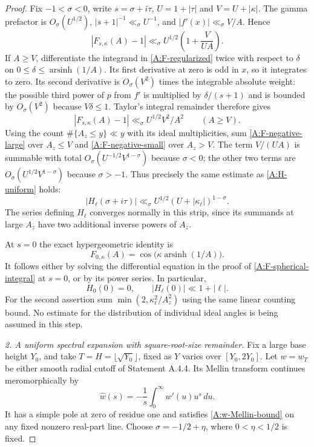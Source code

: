 \begin{proof}
Fix $-1<\sigma<0$, write $s=\sigma+i\tau$,
$U=1+|\tau|$ and $V=U+|\kappa|$. The gamma prefactor is
$O_\sigma(U^{1/2})$, $|s+1|^{-1}\ll_\sigma U^{-1}$,
and $|f'(x)|\ll_\sigma V/A$. Hence
\begin{equation}\label{A:F-negative-large}
 |F_{s,\kappa}(A)-1|
       \ll_\sigma U^{1/2}\left(1+\frac{V}{UA}\right).
\end{equation}
If $A\geq V$, differentiate the integrand in
\eqref{A:F-regularized} twice with respect to $\delta$ on
$0\leq\delta\leq\operatorname{arsinh}(1/A)$.
Its first derivative at zero is odd in $x$, so it integrates to
zero. Its second derivative is $O_\sigma(V^2)$ times the
integrable absolute weight: the possible third power of $p$
from $f'$ is multiplied by $\delta/(s+1)$ and is bounded by
$O_\sigma(V^2)$ because $V\delta\leq1$.
Taylor's integral remainder therefore gives
\begin{equation}\label{A:F-negative-small}
 |F_{s,\kappa}(A)-1|\ll_\sigma U^{1/2}V^2/A^2
 \qquad(A\geq V).
\end{equation}
Using the count $\#\{A_z\leq y\}\ll y$ with its ideal
multiplicities, sum \eqref{A:F-negative-large} over $A_z\leq V$
and \eqref{A:F-negative-small} over $A_z>V$.
The term $V/(UA)$ is summable with total
$O_\sigma(U^{-1/2}V^{1-\sigma})$ because $\sigma<0$;
the other two terms are
$O_\sigma(U^{1/2}V^{1-\sigma})$ because $\sigma>-1$.
Thus precisely the same estimate as \eqref{A:H-uniform} holds:
\begin{equation}\label{A:H-negative}
 |H_\ell(\sigma+i\tau)|
       \ll_\sigma U^{1/2}(U+|\kappa_\ell|)^{1-\sigma}.
\end{equation}
The series defining $H_\ell$ converges normally in this strip,
since its summands at large $A_z$ have two additional inverse
powers of $A_z$.

At $s=0$ the exact hypergeometric identity is
\[
 F_{0,\kappa}(A)=\cos\bigl(\kappa\operatorname{arsinh}(1/A)\bigr).
\]
It follows either by solving the differential equation in the proof
of \eqref{A:F-spherical-integral} at $s=0$, or by its power
series. In particular,
\begin{equation}\label{A:H-at-zero}
 H_0(0)=0,\qquad |H_\ell(0)|\ll1+|\ell|.
\end{equation}
For the second assertion sum
$\min(2,\kappa_\ell^2/A_z^2)$ using the same linear counting
bound. No estimate for the distribution of individual ideal angles
is being assumed in this step.

\emph{2. A uniform spectral expansion with square-root-size remainder.}
Fix a large base height $Y_0$, and take
$T=H=\lfloor\sqrt{Y_0}\rfloor$, fixed as $Y$ varies over
$[Y_0,2Y_0]$. Let $w=w_T$ be either smooth radial cutoff of
Statement A.4.4. Its Mellin transform continues meromorphically by
\[
 \widehat w(s)=-\frac1s\int_0^\infty w'(u)u^s\,du.
\]
It has a simple pole at zero of residue one and satisfies
\eqref{A:w-Mellin-bound} on any fixed nonzero real-part line.
Choose $\sigma=-1/2+\eta$, where $0<\eta<1/2$ is fixed.


\end{proof}
